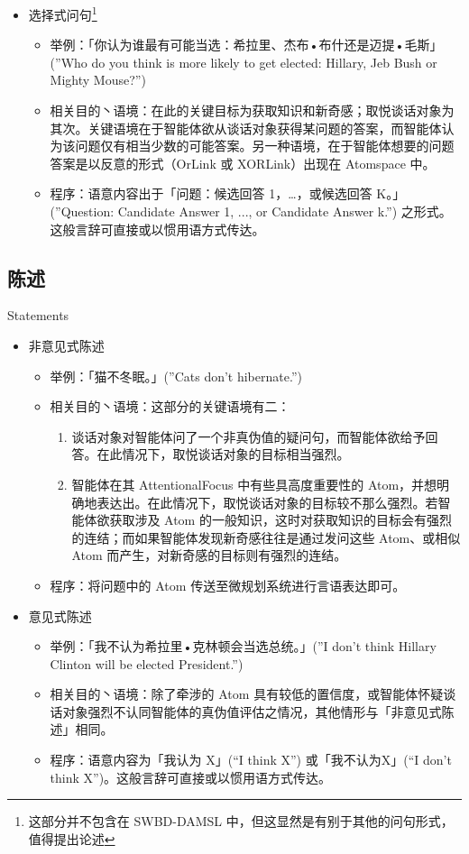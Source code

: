 \begin{itemize}
\item 选择式问句\footnote{这部分并不包含在 SWBD-DAMSL 中，但这显然是有别于其他的问句形式，值得提出论述}
\begin{itemize}
\item 举例：「你认为谁最有可能当选：希拉里、杰布•布什还是迈提•毛斯」(”Who do you think is more likely to get elected: Hillary, Jeb Bush or Mighty Mouse?”)
\item 相关目的丶语境：在此的关键目标为获取知识和新奇感；取悦谈话对象为其次。关键语境在于智能体欲从谈话对象获得某问题的答案，而智能体认为该问题仅有相当少数的可能答案。另一种语境，在于智能体想要的问题答案是以反意的形式（OrLink 或 XORLink）出现在 Atomspace 中。
\item 程序：语意内容出于「问题：候选回答 1，…，或候选回答 K。」(”Question: Candidate Answer 1, ..., or Candidate Answer k.”) 之形式。这般言辞可直接或以惯用语方式传达。
\end{itemize}


\end{itemize}


\subsection{陈述}{Statements}

\begin{itemize}
\item 非意见式陈述
\begin{itemize}
\item 举例：「猫不冬眠。」(”Cats don’t hibernate.”)
\item 相关目的丶语境：这部分的关键语境有二：
\begin{enumerate}
\item 谈话对象对智能体问了一个非真伪值的疑问句，而智能体欲给予回答。在此情况下，取悦谈话对象的目标相当强烈。
\item 智能体在其 AttentionalFocus 中有些具高度重要性的 Atom，并想明确地表达出。在此情况下，取悦谈话对象的目标较不那么强烈。若智能体欲获取涉及 Atom 的一般知识，这时对获取知识的目标会有强烈的连结；而如果智能体发现新奇感往往是通过发问这些 Atom、或相似 Atom 而产生，对新奇感的目标则有强烈的连结。
\end{enumerate}
\item 程序：将问题中的 Atom 传送至微规划系统进行言语表达即可。
\end{itemize}


\item 意见式陈述
\begin{itemize}
\item 举例：「我不认为希拉里•克林顿会当选总统。」(”I don’t think Hillary Clinton will be elected President.”) 
\item 相关目的丶语境：除了牵涉的 Atom 具有较低的置信度，或智能体怀疑谈话对象强烈不认同智能体的真伪值评估之情况，其他情形与「非意见式陈述」相同。
\item 程序：语意内容为「我认为 X」(“I think X”) 或「我不认为X」(“I don’t think X”)。这般言辞可直接或以惯用语方式传达。
\end{itemize}

\end{itemize}

